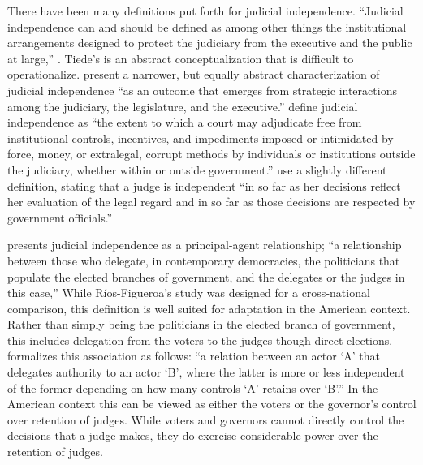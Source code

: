 \documentclass[12pt]{article}
\begin{document}
There have been many definitions put forth for judicial independence.  ``Judicial independence can and should be defined as among other things the institutional arrangements designed to protect the judiciary from the executive and the public at large,'' \citep[131]{Tiede2006}.  Tiede's is an abstract conceptualization that is difficult to operationalize.   \citet[108]{McNollgast2006} present a narrower, but equally abstract characterization of  judicial independence ``as an outcome that emerges from strategic interactions among the judiciary, the legislature, and the executive.''  \citet[286]{Howard2004} define judicial independence as ``the extent to which a court may adjudicate free from institutional controls, incentives, and impediments imposed or intimidated by force, money, or extralegal, corrupt methods by individuals or institutions outside the judiciary, whether within or outside government.''  \citet[4]{Linzer2014} use a slightly different definition, stating that a judge is independent ``in so far as her decisions reflect her evaluation of the legal regard and in so far as those decisions are respected by government officials.''

\citet{Rios2006} presents judicial independence as a principal-agent relationship; ``a relationship between those who delegate, in contemporary democracies, the politicians that populate the elected branches of government, and the delegates or the judges in this case,'' \citep[6]{Rios2006}   While R\'{i}os-Figueroa's study was designed for a cross-national comparison, this definition is well suited for adaptation in the American context.  Rather than simply being the politicians in the elected branch of government, this includes delegation from the voters to the judges though direct elections.  \citet[17]{Rios2006} formalizes this association as follows: ``a relation between an actor `A' that delegates authority to an actor `B', where the latter is more or less independent of the former depending on how many controls `A' retains over `B'.''  In the American context this can be viewed as either the voters or the governor's control over retention of judges.  While voters and governors cannot directly control the decisions that a judge makes, they do exercise considerable power over the retention of judges.  
\end{document}
